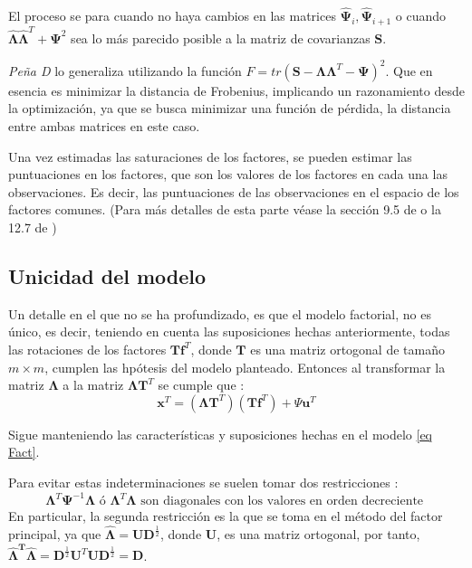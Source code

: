 \noindent El proceso se para cuando no haya cambios en las matrices $\mathbf{\hat{\Psi}}_i,\mathbf{\hat{\Psi}}_{i+1}$ o cuando $\mathbf{\hat{\Lambda}}\mathbf{\hat{\Lambda}}^T+\mathbf{\Psi}^2$ sea lo más parecido posible a la matriz de covarianzas $\mathbf{S}$.

\noindent \emph{Peña D} \cite{Peña 2002} lo generaliza utilizando la función $F=tr(\mathbf{S}-\mathbf{\Lambda}\mathbf{\Lambda}^T-\mathbf{\Psi})^2$. Que en esencia es minimizar la distancia de Frobenius, implicando un razonamiento desde la optimización, ya que se busca minimizar  una función de pérdida, la distancia entre ambas matrices en este caso. 

\noindent Una vez estimadas las saturaciones de los factores, se pueden estimar las puntuaciones en los factores, que son los valores de los factores en cada una las observaciones. Es decir, las  puntuaciones de las observaciones en el espacio de los factores comunes. (Para más detalles de esta parte véase  la sección 9.5 de \cite{Johnson 2007} o la 12.7 de \cite{Peña 2002})

\subsection{Unicidad del modelo}

\noindent Un detalle en el que no se ha profundizado, es que el modelo factorial, no es único, es decir, teniendo en cuenta las suposiciones hechas anteriormente, todas las rotaciones de los factores $\mathbf{Tf}^T$, donde $\mathbf{T}$ es una matriz ortogonal de tamaño $m\times m$, cumplen las hpótesis del modelo planteado. Entonces al transformar la matriz $\mathbf{\Lambda}$ a la matriz $\mathbf{\Lambda T}^T$ se cumple que \cite{Mardia 1979}:
\begin{equation}
\mathbf{x}^T=(\mathbf{\Lambda T}^T)(\mathbf{Tf}^T)+\Psi\mathbf{u}^T
\end{equation}

Sigue manteniendo las características y suposiciones hechas en el modelo \ref{eq Fact}.

\noindent Para evitar estas indeterminaciones se suelen tomar dos restricciones \cite{Mardia 1979}:
\begin{equation}
\mathbf{\Lambda}^T \mathbf{\Psi}^{-1}\mathbf{\Lambda} \text{ ó } \mathbf{\Lambda}^T \mathbf{\Lambda} \text{ son diagonales con los valores en orden decreciente }
\end{equation}
\noindent En particular, la segunda restricción es la que se toma en el método del factor principal, ya que $\mathbf{\hat{\Lambda}}=\mathbf{UD}^{\frac{1}{2}}$, donde $\mathbf{U}$, es una matriz ortogonal, por tanto, $\mathbf{\hat{\Lambda}^T \hat{\Lambda}}=\mathbf{D}^{\frac{1}{2}}\mathbf{U}^T\mathbf{U}\mathbf{D}^{\frac{1}{2}}=\mathbf{D}$. 

